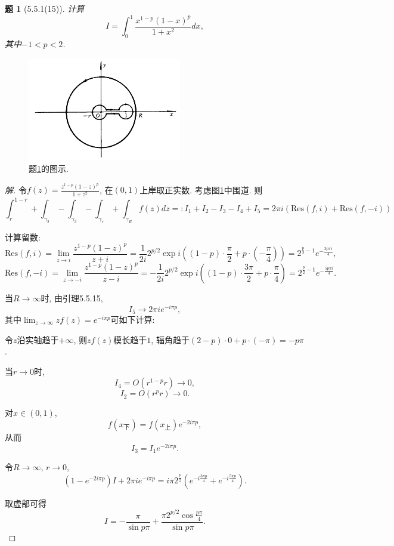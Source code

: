 \documentclass{article}[a4paper, 12pt]
\theoremstyle{mystyle}
\newtheorem{problem}{题}
\newenvironment{solution}{\begin{proof}[解]}{\end{proof}}
\begin{document}
\begin{problem}[5.5.1(15)]\label{15}
  计算\[I=\int_0^1 \frac{x^{1-p}(1-x)^p}{1+x^2}dx,\] 其中\(-1<p<2\).
\end{problem}

\begin{figure}[htbp]
  \centering
  \includegraphics[width=0.6\textwidth]{images/15.png}
  \caption{题\ref{15}的图示.}
  \label{fig:15}
\end{figure}

\begin{solution}
  令\(f(z)=\frac{z^{1-p}(1-z)^p}{1+z^2}\), 在\((0,1)\)上岸取正实数. 考虑图\ref{fig:15}中围道. 则\[\int_{r}^{1-r}+\int_{\gamma_2}-\int_{\gamma_3}-\int_{\gamma_r}+\int_{\gamma_R} f(z)dz=:I_1+I_2-I_3-I_4+I_5=2\pi i\left(\text{Res}(f,i)+\text{Res}(f,-i)\right)\]

  计算留数: \[\text{Res}(f,i)=\lim_{z\to i}\frac{z^{1-p}(1-z)^p}{z+i}=\frac{1}{2i}2^{p/2}\exp i\left((1-p)\cdot\frac{\pi}{2}+p\cdot(-\frac{\pi}{4})\right)=2^{\frac{p}{2}-1}e^{-\frac{3p\pi i}{4}},\] \[\text{Res}(f,-i)=\lim_{z\to -i}\frac{z^{1-p}(1-z)^p}{z-i}=-\frac{1}{2i}2^{p/2}\exp i\left((1-p)\cdot\frac{3\pi}{2}+p\cdot\frac{\pi}{4}\right)=2^{\frac{p}{2}-1}e^{-\frac{5p\pi i}{4}}.\]

  当\(R\to\infty\)时, 由引理5.5.15, \[I_5\to2\pi i e^{-i\pi p},\] 其中\(\lim_{z\to\infty} zf(z)=e^{-i\pi p}\)可如下计算:

  令\(z\)沿实轴趋于\(+\infty\), 则\(zf(z)\)模长趋于\(1\), 辐角趋于\((2-p)\cdot0+p\cdot(-\pi)=-p\pi\).

  当\(r\to0\)时, \[I_4=O(r^{1-p}r)\to 0,\] \[I_2=O(r^p r)\to0.\]

  对\(x\in(0,1)\), \[f(x_{\text{下}})=f(x_{\text{上}})e^{-2i\pi p},\] 从而\[I_3=I_1e^{-2i \pi p}.\]

  令\(R\to\infty\), \(r\to 0\), \[(1-e^{-2i\pi p})I+2\pi ie^{-i\pi p}=i\pi 2^{\frac{p}{2}}\left(e^{-i\frac{3\pi p}{4}}+e^{-i\frac{5\pi p}{4}}\right).\]

  取虚部可得\[I=-\frac{\pi}{\sin p\pi}+\frac{\pi 2^{p/2}\cos \frac{p\pi}{4}}{\sin p\pi}. \tag*{\(\qed\)}\]
  \renewcommand{\qedsymbol}{}
\end{solution}
\end{document}
